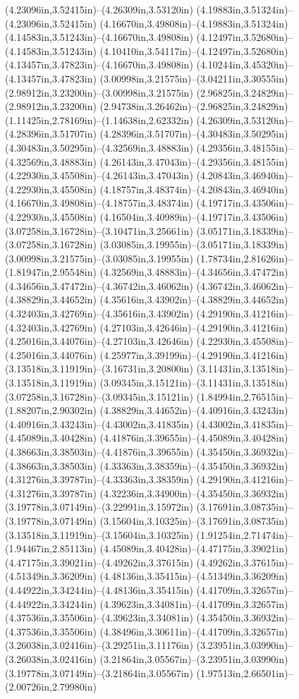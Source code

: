 (4.23096in,3.52415in)--(4.26309in,3.53120in) (4.19883in,3.51324in)--(4.23096in,3.52415in) (4.16670in,3.49808in)--(4.19883in,3.51324in) (4.14583in,3.51243in)--(4.16670in,3.49808in) (4.12497in,3.52680in)--(4.14583in,3.51243in) (4.10410in,3.54117in)--(4.12497in,3.52680in) (4.13457in,3.47823in)--(4.16670in,3.49808in) (4.10244in,3.45320in)--(4.13457in,3.47823in) (3.00998in,3.21575in)--(3.04211in,3.30555in) (2.98912in,3.23200in)--(3.00998in,3.21575in) (2.96825in,3.24829in)--(2.98912in,3.23200in) (2.94738in,3.26462in)--(2.96825in,3.24829in) (1.11425in,2.78169in)--(1.14638in,2.62332in) (4.26309in,3.53120in)--(4.28396in,3.51707in) (4.28396in,3.51707in)--(4.30483in,3.50295in) (4.30483in,3.50295in)--(4.32569in,3.48883in) (4.29356in,3.48155in)--(4.32569in,3.48883in) (4.26143in,3.47043in)--(4.29356in,3.48155in) (4.22930in,3.45508in)--(4.26143in,3.47043in) (4.20843in,3.46940in)--(4.22930in,3.45508in) (4.18757in,3.48374in)--(4.20843in,3.46940in) (4.16670in,3.49808in)--(4.18757in,3.48374in) (4.19717in,3.43506in)--(4.22930in,3.45508in) (4.16504in,3.40989in)--(4.19717in,3.43506in) (3.07258in,3.16728in)--(3.10471in,3.25661in) (3.05171in,3.18339in)--(3.07258in,3.16728in) (3.03085in,3.19955in)--(3.05171in,3.18339in) (3.00998in,3.21575in)--(3.03085in,3.19955in) (1.78734in,2.81626in)--(1.81947in,2.95548in) (4.32569in,3.48883in)--(4.34656in,3.47472in) (4.34656in,3.47472in)--(4.36742in,3.46062in) (4.36742in,3.46062in)--(4.38829in,3.44652in) (4.35616in,3.43902in)--(4.38829in,3.44652in) (4.32403in,3.42769in)--(4.35616in,3.43902in) (4.29190in,3.41216in)--(4.32403in,3.42769in) (4.27103in,3.42646in)--(4.29190in,3.41216in) (4.25016in,3.44076in)--(4.27103in,3.42646in) (4.22930in,3.45508in)--(4.25016in,3.44076in) (4.25977in,3.39199in)--(4.29190in,3.41216in) (3.13518in,3.11919in)--(3.16731in,3.20800in) (3.11431in,3.13518in)--(3.13518in,3.11919in) (3.09345in,3.15121in)--(3.11431in,3.13518in) (3.07258in,3.16728in)--(3.09345in,3.15121in) (1.84994in,2.76515in)--(1.88207in,2.90302in) (4.38829in,3.44652in)--(4.40916in,3.43243in) (4.40916in,3.43243in)--(4.43002in,3.41835in) (4.43002in,3.41835in)--(4.45089in,3.40428in) (4.41876in,3.39655in)--(4.45089in,3.40428in) (4.38663in,3.38503in)--(4.41876in,3.39655in) (4.35450in,3.36932in)--(4.38663in,3.38503in) (4.33363in,3.38359in)--(4.35450in,3.36932in) (4.31276in,3.39787in)--(4.33363in,3.38359in) (4.29190in,3.41216in)--(4.31276in,3.39787in) (4.32236in,3.34900in)--(4.35450in,3.36932in) (3.19778in,3.07149in)--(3.22991in,3.15972in) (3.17691in,3.08735in)--(3.19778in,3.07149in) (3.15604in,3.10325in)--(3.17691in,3.08735in) (3.13518in,3.11919in)--(3.15604in,3.10325in) (1.91254in,2.71474in)--(1.94467in,2.85113in) (4.45089in,3.40428in)--(4.47175in,3.39021in) (4.47175in,3.39021in)--(4.49262in,3.37615in) (4.49262in,3.37615in)--(4.51349in,3.36209in) (4.48136in,3.35415in)--(4.51349in,3.36209in) (4.44922in,3.34244in)--(4.48136in,3.35415in) (4.41709in,3.32657in)--(4.44922in,3.34244in) (4.39623in,3.34081in)--(4.41709in,3.32657in) (4.37536in,3.35506in)--(4.39623in,3.34081in) (4.35450in,3.36932in)--(4.37536in,3.35506in) (4.38496in,3.30611in)--(4.41709in,3.32657in) (3.26038in,3.02416in)--(3.29251in,3.11176in) (3.23951in,3.03990in)--(3.26038in,3.02416in) (3.21864in,3.05567in)--(3.23951in,3.03990in) (3.19778in,3.07149in)--(3.21864in,3.05567in) (1.97513in,2.66501in)--(2.00726in,2.79980in) 